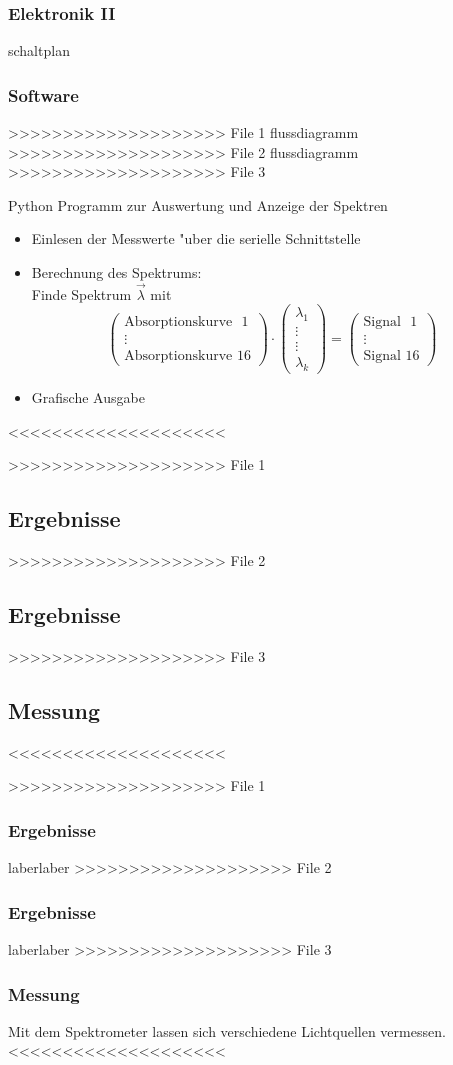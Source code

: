 \documentclass[10pt]{beamer}
\begin{document}
\frame
{
\frametitle{Elektronik II}
schaltplan
}
\frame
{
\frametitle{Software}
>>>>>>>>>>>>>>>>>>>> File 1
flussdiagramm
>>>>>>>>>>>>>>>>>>>> File 2
flussdiagramm
>>>>>>>>>>>>>>>>>>>> File 3
\begin{block}{Python Programm zur Auswertung und Anzeige der Spektren}
\begin{itemize}
\item Einlesen der Messwerte "uber die serielle Schnittstelle
\item Berechnung des Spektrums:\\[.5\baselineskip]
Finde Spektrum $\vec{\lambda}$ mit
\[
\begin{pmatrix}
\text{Absorptionskurve ~1}\\
\vdots\\
\text{Absorptionskurve 16}
\end{pmatrix}
\cdot
\begin{pmatrix}
\lambda_1\\
\vdots\\
\vdots\\
\lambda_k
\end{pmatrix}
=
\begin{pmatrix}
\text{Signal ~1}\\
\vdots\\
\text{Signal 16}
\end{pmatrix}
\]

\item Grafische Ausgabe
\end{itemize}
\end{block}
<<<<<<<<<<<<<<<<<<<<
}
>>>>>>>>>>>>>>>>>>>> File 1
\subsection[]{Ergebnisse}
>>>>>>>>>>>>>>>>>>>> File 2
\subsection[]{Ergebnisse}
>>>>>>>>>>>>>>>>>>>> File 3
\subsection[]{Messung}
<<<<<<<<<<<<<<<<<<<<
\frame
{
>>>>>>>>>>>>>>>>>>>> File 1
\frametitle{Ergebnisse}
laberlaber
>>>>>>>>>>>>>>>>>>>> File 2
\frametitle{Ergebnisse}
laberlaber
>>>>>>>>>>>>>>>>>>>> File 3
\frametitle{Messung}
Mit dem Spektrometer lassen sich verschiedene Lichtquellen vermessen.
<<<<<<<<<<<<<<<<<<<<
}
\end{document}
